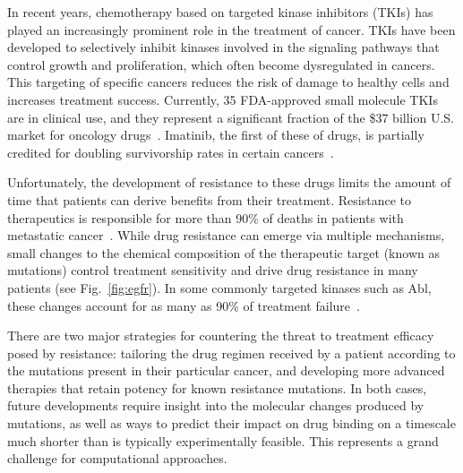 
In recent years, chemotherapy based on targeted kinase inhibitors (TKIs) has
played an increasingly prominent role in the treatment of cancer. 
TKIs have been developed to selectively inhibit kinases involved in the
signaling pathways that control growth and proliferation, which often become
dysregulated in cancers. This targeting of specific cancers reduces the risk
of damage to healthy cells and increases treatment success. Currently, 
35 FDA-approved small molecule TKIs are in clinical use, and they represent a
significant fraction of the \$37 billion U.S. market for oncology
drugs~\cite{FDA, Zhao2014}. Imatinib, the first of these of drugs, is
partially credited for doubling survivorship rates in certain
cancers~\cite{Zhao2014, ACSreport}.

Unfortunately, the development of resistance to these drugs limits the amount
of time that patients can derive benefits from their treatment. Resistance to
therapeutics is responsible for more than 90\% of deaths in patients with
metastatic cancer~\cite{Longley2005}. While drug resistance can emerge via
multiple mechanisms, small changes to the chemical composition of the
therapeutic target (known as mutations) control treatment sensitivity and
drive drug resistance in many patients (see Fig.~\ref{fig:egfr}). In some
commonly targeted kinases such as Abl, these changes account for as many as
90\% of treatment failure~\cite{Shah2002}.


There are two major strategies for countering the threat to treatment
efficacy posed by resistance: tailoring the drug regimen received by a
patient according to the mutations present in their particular cancer, and
developing more advanced %
therapies that retain potency for known resistance mutations. In both cases,
future developments require insight into the molecular changes produced by
mutations, as well as ways to predict their impact on drug binding on a
timescale much shorter than is typically experimentally feasible. This
represents a grand challenge for computational approaches.

